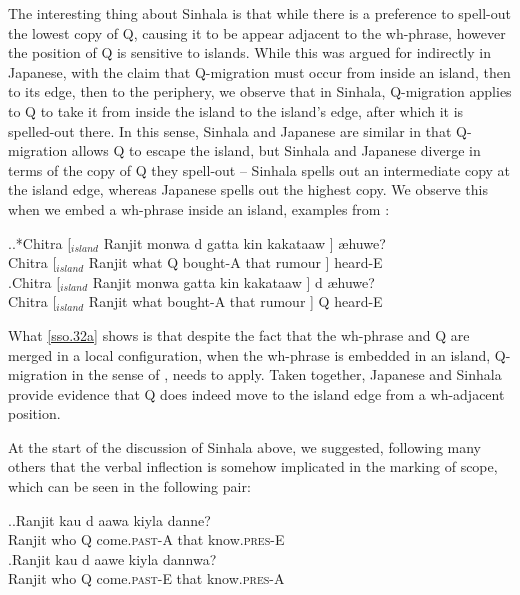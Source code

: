 \documentclass[charis]{glossa}
\begin{document}
The interesting thing about Sinhala is that while there is a preference to spell-out the lowest copy of Q, causing it to be appear adjacent to the wh-phrase, however the position of Q is sensitive to islands. While this was argued for indirectly in Japanese, with the claim that Q-migration must occur from inside an island, then to its edge, then to the periphery, we observe that in Sinhala, Q-migration applies to Q to take it from inside the island to the island's edge, after which it is spelled-out there. In this sense, Sinhala and Japanese are similar in that Q-migration allows Q to escape the island, but Sinhala and Japanese diverge in terms of the copy of Q they spell-out -- Sinhala spells out an intermediate copy at the island edge, whereas Japanese spells out the highest copy. We observe this when we embed a wh-phrase inside an island, examples from \cite{slade:2011}:

\ex.\ag.*\label{sso.32a}Chitra [$_{island}$ Ranjit mon{\textschwa}wa d{\textschwa} gatta ki{\textschwa}n{\textschwa} kakataaw{\textschwa} ] {\ae}huwe?\\
   Chitra [$_{island}$ Ranjit what Q bought-A that rumour ] heard-E\\
   \bg.\label{sso.32b}Chitra [$_{island}$ Ranjit mon{\textschwa}wa gatta ki{\textschwa}n{\textschwa} kakataaw{\textschwa} ] d{\textschwa} {\ae}huwe?\\
   Chitra [$_{island}$ Ranjit what bought-A that rumour ] Q heard-E\\

What \ref{sso.32a} shows is that despite the fact that the wh-phrase and Q are merged in a local configuration, when the wh-phrase is embedded in an island, Q-migration in the sense of \cite{hagstrom:1998}, needs to apply. Taken together, Japanese and Sinhala provide evidence that Q does indeed move to the island edge from a wh-adjacent position.

At the start of the discussion of Sinhala above, we suggested, following many others \citep{hagstrom:1998, kishimoto:1992, kishimoto:2005, slade:2011} that the verbal inflection is somehow implicated in the marking of scope, which can be seen in the following pair:

\ex.\ag.\label{sso.33a}Ranjit kau d{\textschwa} aawa kiy{\textschwa}la danne?\\
   Ranjit who Q come.\textsc{past}-A that know.\textsc{pres}-E\\
   \bg.\label{sso.33b}Ranjit kau d{\textschwa} aawe kiy{\textschwa}la dann{\textschwa}wa?\\
   Ranjit who Q come.\textsc{past}-E that know.\textsc{pres}-A\\
\end{document}
